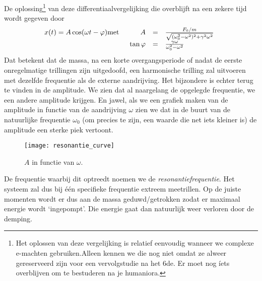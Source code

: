De oplossing\footnote{Het oplossen van deze vergelijking is relatief eenvoudig wanneer we complexe e-machten gebruiken.\footnotemark Alleen kennen we die nog niet omdat ze alweer gereserveerd zijn voor een vervolgstudie na het 6de. Er moet nog \'iets overblijven om te bestuderen na je humaniora.} van deze differentiaalvergelijking die overblijft na een zekere tijd wordt gegeven door
\begin{eqnarray*}
x(t)=A\cos(\omega t-\varphi)&\mathrm{met}&
\begin{array}[t]{rcl}
\displaystyle A&=&\frac{F_0/m}{\sqrt{(\omega_0^2-\omega^2)^2+\gamma^2\omega^2}}\\
\displaystyle\tan\varphi&=&\frac{\gamma\omega}{\omega_0^2-\omega^2}
\end{array}
\end{eqnarray*}
Dat betekent dat de massa, na een korte overgangsperiode of nadat de eerste onregelmatige trillingen zijn uitgedoofd, een harmonische trilling zal uitvoeren met dezelfde frequentie als de externe aandrijving. Het bijzondere is echter terug te vinden in de amplitude. We zien dat al naargelang de opgelegde frequentie, we een andere amplitude krijgen. En jawel, als we een grafiek maken van de amplitude in functie van de aandrijving $\omega$ zien we dat in de buurt van de natuurlijke frequentie $\omega_0$ (om precies te zijn, een waarde die net iets kleiner is) de amplitude een sterke piek vertoont. 
\begin{figure}[h]
\centering
\texttt{[image: resonantie\_curve]}
\caption{$A$ in functie van $\omega$.}
\end{figure}
De frequentie waarbij dit optreedt noemen we de \emph{resonantiefrequentie}. Het systeem zal dus bij \'e\'en specifieke frequentie extreem meetrillen. Op de juiste momenten wordt er dus aan de massa geduwd/getrokken zodat er maximaal energie wordt `ingepompt'. Die energie gaat dan natuurlijk weer verloren door de demping.


